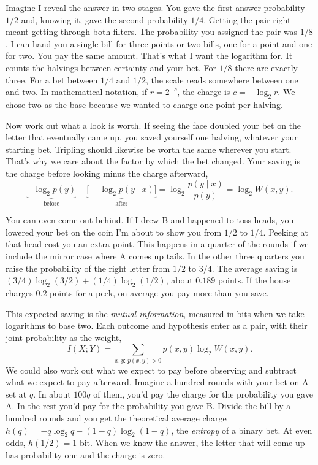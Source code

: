 Imagine I reveal the answer in two stages. You gave the first answer probability $1/2$ and, knowing it, gave the second probability $1/4$. Getting the pair right meant getting through both filters. The probability you assigned the pair was $1/8$. I can hand you a single bill for three points or two bills, one for a point and one for two. You pay the same amount. That's what I want the logarithm for. It counts the halvings between certainty and your bet. For $1/8$ there are exactly three. For a bet between $1/4$ and $1/2$, the scale reads somewhere between one and two. In mathematical notation, if $r=2^{-c}$, the charge is $c=-\log_2 r$. We chose two as the base because we wanted to charge one point per halving.

Now work out what a look is worth. If seeing the face doubled your bet on the letter that eventually came up, you saved yourself one halving, whatever your starting bet. Tripling should likewise be worth the same wherever you start. That's why we care about the factor by which the bet changed. Your saving is the charge before looking minus the charge afterward,
\[
 \underbrace{-\log_2 p(y)}_{\text{before}}
 -\underbrace{\big[-\log_2 p(y\mid x)\big]}_{\text{after}}
 =\log_2\frac{p(y\mid x)}{p(y)}=\log_2 W(x,y).
\]

You can even come out behind. If I drew B and happened to toss heads, you lowered your bet on the coin I'm about to show you from $1/2$ to $1/4$. Peeking at that head cost you an extra point. This happens in a quarter of the rounds if we include the mirror case where A comes up tails. In the other three quarters you raise the probability of the right letter from $1/2$ to $3/4$. The average saving is $(3/4)\log_2(3/2)+(1/4)\log_2(1/2)$, about $0.189$ points. If the house charges $0.2$ points for a peek, on average you pay more than you save.

This expected saving is the \emph{mutual information}, measured in bits when we take logarithms to base two. Each outcome and hypothesis enter as a pair, with their joint probability as the weight,
\[
 I(X;Y)=\sum_{x,y:\,p(x,y)>0}p(x,y)\log_2 W(x,y).
\]
We could also work out what we expect to pay before observing and subtract what we expect to pay afterward. Imagine a hundred rounds with your bet on A set at $q$. In about $100q$ of them, you'd pay the charge for the probability you gave A. In the rest you'd pay for the probability you gave B. Divide the bill by a hundred rounds and you get the theoretical average charge $h(q)=-q\log_2 q-(1-q)\log_2(1-q)$, the \emph{entropy} of a binary bet. At even odds, $h(1/2)=1$ bit. When we know the answer, the letter that will come up has probability one and the charge is zero.

